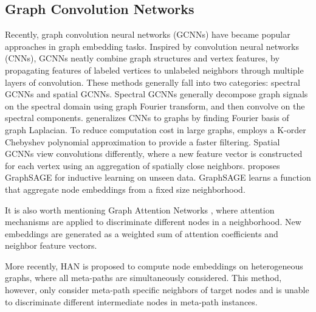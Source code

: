 \subsection{Graph Convolution Networks}
Recently, graph convolution neural networks (GCNNs) have became popular approaches in graph embedding tasks. Inspired by convolution neural networks (CNNs), GCNNs neatly combine graph structures and vertex features, by propagating features of labeled vertices  to unlabeled neighbors through multiple layers of convolution.
These methods generally fall into two categories: spectral GCNNs and spatial GCNNs.
Spectral GCNNs generally decompose graph signals on the spectral domain using graph Fourier transform, and then convolve on the spectral components. \citet{BrunaZSL13} generalizes CNNs to graphs by finding Fourier basis of graph Laplacian. 
To reduce computation cost in large graphs, \citet{DefferrardBV16} employs a K-order Chebyshev polynomial approximation to provide a faster filtering.
Spatial GCNNs view convolutions differently, where a new feature vector is constructed for each vertex using an aggregation of spatially close neighbors. \citet{HamiltonYL17} proposes GraphSAGE for inductive learning on unseen data. GraphSAGE learns a function that aggregate node embeddings from a fixed size neighborhood.

It is also worth mentioning Graph Attention Networks \citep{VelickovicCCRLB18}, where attention mechanisms \citep{VaswaniSPUJGKP17,BahdanauCB14} are applied to discriminate different nodes in a neighborhood. New embeddings are generated as a weighted sum of attention coefficients and neighbor feature vectors. 

More recently, HAN \citep{WangJSWYCY19} is proposed to compute node embeddings on heterogeneous graphs, where all meta-paths are simultaneously considered. This method, however, only consider meta-path specific neighbors of target nodes and is unable to discriminate different intermediate nodes in meta-path instances.




















